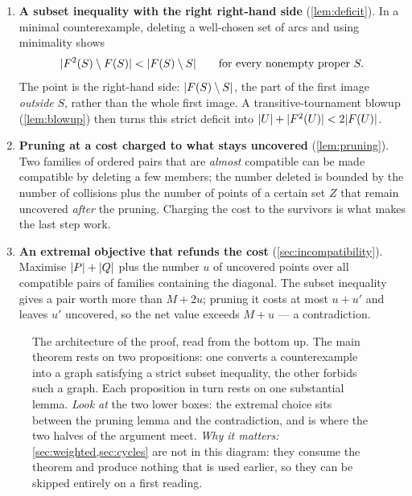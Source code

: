 \begin{ideabox}[title={The three engines}]
\begin{enumerate}[leftmargin=1.3em,itemsep=2pt,topsep=1pt]
\item \textbf{A subset inequality with the right right-hand side}
  (\cref{lem:deficit}). In a minimal counterexample, deleting a well-chosen set of arcs and using
  minimality shows
  \[
    \lvert F^2(S)\setminus F(S)\rvert<\lvert F(S)\setminus S\rvert
    \qquad\text{for every nonempty proper }S .
  \]
  The point is the right-hand side: $\lvert F(S)\setminus S\rvert$, the part of the first image
  \emph{outside} $S$, rather than the whole first image. A transitive-tournament blowup
  (\cref{lem:blowup}) then turns this strict deficit into
  $\lvert U\rvert+\lvert F^2(U)\rvert<2\lvert F(U)\rvert$.

\item \textbf{Pruning at a cost charged to what stays uncovered} (\cref{lem:pruning}). Two families
  of ordered pairs that are \emph{almost} compatible can be made compatible by deleting a few
  members; the number deleted is bounded by the number of collisions plus the number of points of
  a certain set $Z$ that remain uncovered \emph{after} the pruning. Charging the cost to the
  survivors is what makes the last step work.

\item \textbf{An extremal objective that refunds the cost} (\cref{sec:incompatibility}). Maximise
  $\lvert P\rvert+\lvert Q\rvert$ plus the number $u$ of uncovered points over all compatible pairs of families
  containing the diagonal. The subset inequality gives a pair worth more than $M+2u$; pruning it
  costs at most $u+u'$ and leaves $u'$ uncovered, so the net value exceeds $M+u$ --- a
  contradiction.
\end{enumerate}
\end{ideabox}

\begin{figure}[t]
\centering

\caption{The architecture of the proof, read from the bottom up. The main theorem rests on two
 propositions: one converts a counterexample into a graph satisfying a strict subset inequality,
 the other forbids such a graph. Each proposition in turn rests on one substantial lemma.
 \emph{Look at} the two lower boxes: the extremal choice sits between the pruning lemma and the
 contradiction, and is where the two halves of the argument meet. \emph{Why it matters:} \cref{sec:weighted,sec:cycles} are not in this diagram: they consume the
 theorem and produce nothing that is used earlier, so they can be skipped entirely on a first
 reading.}
\label{fig:roadmap}
\end{figure}

